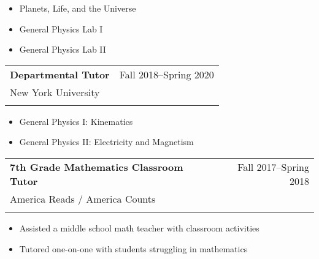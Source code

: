 \documentclass[letterpaper,10pt]{article}
\makeatletter
\newcommand{\resitem}[1]{\item #1 \vspace{-6pt}}
\newcommand{\ressubheading}[5]{
    \vspace{10pt}
    \begin{tabular*}{7.0in}{l@{\extracolsep{\fill}}r}
        \textbf{#1} & #2 \\
        #3 & #4 \\
        #5 & \\
    \end{tabular*}\vspace{-5pt}
}
\makeatother
\begin{document}
    \begin{itemize}
        \resitem{Planets, Life, and the Universe}
        \resitem{General Physics Lab I}
        \resitem{General Physics Lab II}
    \end{itemize}

    \ressubheading{Departmental Tutor}{Fall 2018--Spring 2020}{New York University}{}{}
    \vspace{-0.15in}
    
        \begin{itemize}
                \resitem{General Physics I: Kinematics}
                \resitem{General Physics II: Electricity and Magnetism}
        \end{itemize}
    
    \ressubheading{7th Grade Mathematics Classroom Tutor}{Fall 2017--Spring 2018}{America Reads / America Counts}{}{}
    \vspace{-0.15in}
    
        \begin{itemize}
            \resitem{Assisted a middle school math teacher with classroom activities}
            \resitem{Tutored one-on-one with students struggling in mathematics}
        \end{itemize}
    
    
\end{document}
